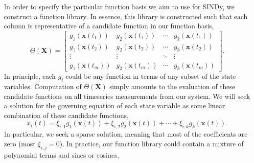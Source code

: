 \documentclass[10pt]{paper}
\begin{document}
In order to specify the particular function basis we aim to use for SINDy, we construct a function library. In essence, this library is constructed such that each column is representative of a candidate function in our function basis, 
\[ \Theta(\mathbf X) = \begin{bmatrix}
	g_1(\mathbf x(t_1)) & g_2(\mathbf x(t_1)) & \cdots & g_k(\mathbf x(t_1)) \\ 
	g_1(\mathbf x(t_2)) & g_2(\mathbf x(t_2)) & \cdots & g_k(\mathbf x(t_2)) \\ 
	\vdots & \vdots & \ddots & \vdots \\ 
	g_1(\mathbf x(t_m)) & g_2(\mathbf x(t_m)) & \cdots & g_k(\mathbf x(t_m)) 
\end{bmatrix}. \]
In principle, each $g_i$ could be any function in terms of any subset of the state variables. Computation of $\Theta(\mathbf X)$ simply amounts to the evaluation of these candidate functions on all timeseries measurements from our system. 
We will seek a solution for the governing equation of each state variable as some linear combination of these candidate functions, 
\[ \dot x_i(t) = \xi_{i, 1}g_1(\mathbf x(t)) + \xi_{i, 2}g_2(\mathbf x(t)) + \cdots + \xi_{i, k}g_k(\mathbf x(t)). \]
In particular, we seek a sparse solution, meaning that most of the coefficients are zero (most $\xi_{i, j} = 0$). 
In practice, our function library could contain a mixture of polynomial terms and sines or cosines, 
\end{document}
